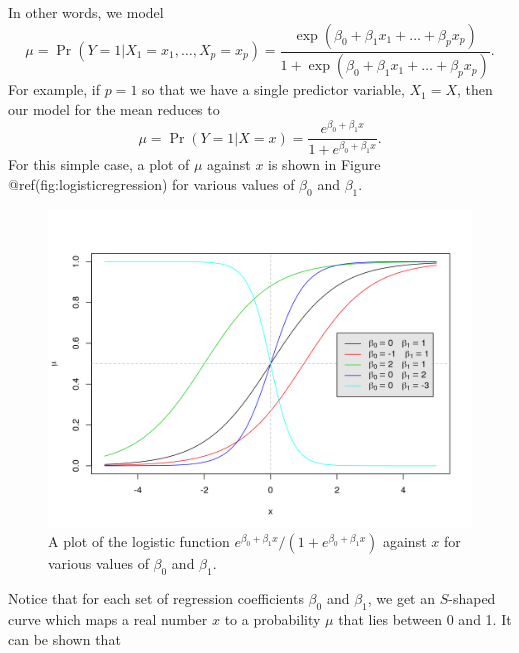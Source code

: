 \documentclass[
]{article}
\begin{document}
In other words, we model \begin{equation*}
\mu = \Pr(Y = 1 | X_1 = x_1, \ldots, X_p = x_p) = \frac{\exp(\beta_0 + \beta_1 x_{1} + \ldots + \beta_p x_{p})}{1 + \exp(\beta_0 + \beta_1 x_{1} + \ldots + \beta_p x_{p})}.
\end{equation*} For example, if \(p=1\) so that we have a single
predictor variable, \(X_1 = X\), then our model for the mean reduces to
\begin{equation*}
\mu = \Pr(Y = 1 | X = x) = \frac{e^{\beta_0 + \beta_1 x}}{1 + e^{\beta_0 + \beta_1 x}}.
\end{equation*} For this simple case, a plot of \(\mu\) against \(x\) is
shown in Figure @ref(fig:logisticregression) for various values of
\(\beta_0\) and \(\beta_1\).

\begin{figure}[th]

{\centering \includegraphics{logisticregression-1} 

}

\caption{A plot of the logistic function $e^{\beta_0 + \beta_1 x} / (1 + e^{\beta_0 + \beta_1 x})$ against $x$ for various values of $\beta_0$ and $\beta_1$.}\label{fig:logisticregression}
\end{figure}

Notice that for each set of regression coefficients \(\beta_0\) and
\(\beta_1\), we get an \(S\)-shaped curve which maps a real number \(x\)
to a probability \(\mu\) that lies between 0 and 1. It can be shown that
\end{document}
